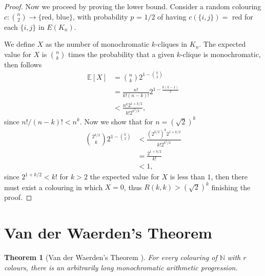 \documentclass[12pt,twoside,a4paper,bibliography=totocnumbered]{book}
\numberwithin{equation}{section}
\newtheorem{theorem}             {Theorem}[section]
\theoremstyle{remark}
\begin{document}
\begin{proof}
Now we proceed by proving the lower bound. Consider a random colouring $c\colon \binom{n}{2} \rightarrow \{$red, blue$\}$, with probability $p$ = $1/2$ of having $c(\{i,j\}) =$ red for each $\{i,j\}$ in $E(K_n)$.

We define $X$ as the number of monochromatic $k$-cliques in $K_n$. The expected value for $X$ is $\binom{n}{k}$ times the probability that a given $k$-clique is monochromatic, then follows 
\begin{align*}
\mathbb{E}[X] &= \binom{n}{k}2^{1-\binom{k}{2}}\\ 
&= \frac{n!}{k!(n-k)!}2^{1-\frac{k(k-1)}{2}}\\ 
&< \frac{n^k 2^{1 +k/2}}{k!2^{k^2/2}},
\end{align*}
since $n!/(n-k)! < n^k$. Now we show that for $n = (\sqrt{2})^k$
\begin{align*}
\binom{2^{k/2}}{k}2^{1-\binom{k}{2}}&< \frac{(2^{k/2})^k 2^{1+k/2}}{k! 2^{k^2/2}}\\ 
&= \frac{2^{1+k/2}}{k!}\\ 
&< 1,
\end{align*}
since $2^{1+k/2} < k!$ for $k>2$ the expected value for $X$ is less than $1$, then there must exist a colouring in which $X=0$, thus $R(k,k) > (\sqrt{2})^k$ finishing the proof.
\end{proof}

\section{Van der Waerden's Theorem}

\begin{theorem}[{Van der Waerden's Theorem \cite{Van27}}] %
 For every colouring of  $\mathbb{N}$ with $r$ colours, there is an arbitrarily long monochromatic arithmetic progression. 
\end{theorem}
\end{document}
